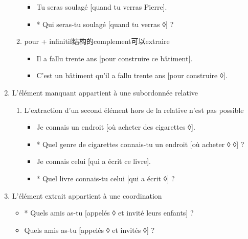 \documentclass[UTF8]{report}
\begin{document}
\begin{enumerate}
\begin{enumerate}
        \begin{itemize}
            \item Tu seras soulagé [quand tu verras Pierre].
            \item * Qui seras-tu soulagé [quand tu verras ◊] ?
        \end{itemize}
        \item pour + infinitif结构的complement可以extraire
        \begin{itemize}
            \item Il a fallu trente ans [pour construire ce bâtiment].
            \item C’est un bâtiment qu’il a fallu trente ans [pour construire ◊].
        \end{itemize}
    \end{enumerate}
    \item L’élément manquant appartient à une subordonnée relative
    \begin{enumerate}
        \item L’extraction d’un second élément hors de la relative n’est pas possible
        \begin{itemize}
            \item Je connais un endroit [où acheter des cigarettes ◊].
            \item * Quel genre de cigarettes connais-tu un endroit [où acheter ◊ ◊] ?
            \item Je connais celui [qui a écrit ce livre].
            \item * Quel livre connais-tu celui [qui a écrit ◊] ?
        \end{itemize}
    \end{enumerate}
    \item L’élément extrait appartient à une coordination
    \begin{itemize}
        \item * Quels amis as-tu [appelés ◊ et invité leurs enfants] ?
        \item Quels amis as-tu [appelés ◊ et invités ◊] ?
    \end{itemize}
\end{enumerate}
\end{document}
